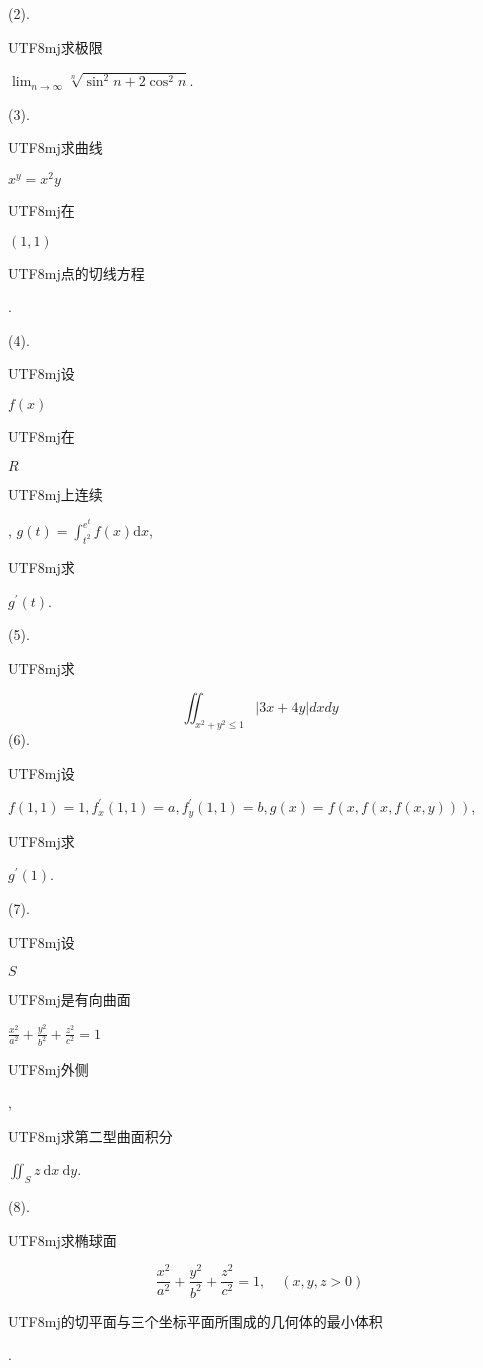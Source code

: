 \documentclass[10pt]{article}
\begin{document}
(2). \begin{CJK}{UTF8}{mj}求极限\end{CJK} $\lim _{n \rightarrow \infty} \sqrt[n]{\sin ^{2} n+2 \cos ^{2} n}$.

(3). \begin{CJK}{UTF8}{mj}求曲线\end{CJK} $x^{y}=x^{2} y$ \begin{CJK}{UTF8}{mj}在\end{CJK} $(1,1)$ \begin{CJK}{UTF8}{mj}点的切线方程\end{CJK}.

(4). \begin{CJK}{UTF8}{mj}设\end{CJK} $f(x)$ \begin{CJK}{UTF8}{mj}在\end{CJK} $R$ \begin{CJK}{UTF8}{mj}上连续\end{CJK}, $g(t)=\int_{t^{2}}^{e^{t}} f(x) \mathrm{d} x$, \begin{CJK}{UTF8}{mj}求\end{CJK} $g^{\prime}(t)$.

(5).\begin{CJK}{UTF8}{mj}求\end{CJK}
$$
\iint_{x^{2}+y^{2} \leqslant 1}|3 x+4 y| d x d y
$$
(6). \begin{CJK}{UTF8}{mj}设\end{CJK} $f(1,1)=1, f_{x}^{\prime}(1,1)=a, f_{y}^{\prime}(1,1)=b, g(x)=f(x, f(x, f(x, y)))$, \begin{CJK}{UTF8}{mj}求\end{CJK} $g^{\prime}(1)$.

(7). \begin{CJK}{UTF8}{mj}设\end{CJK} $S$ \begin{CJK}{UTF8}{mj}是有向曲面\end{CJK} $\frac{x^{2}}{a^{2}}+\frac{y^{2}}{b^{2}}+\frac{z^{2}}{c^{2}}=1$ \begin{CJK}{UTF8}{mj}外侧\end{CJK}, \begin{CJK}{UTF8}{mj}求第二型曲面积分\end{CJK} $\iint_{S} z \mathrm{~d} x \mathrm{~d} y$.

(8). \begin{CJK}{UTF8}{mj}求椭球面\end{CJK}
$$
\frac{x^{2}}{a^{2}}+\frac{y^{2}}{b^{2}}+\frac{z^{2}}{c^{2}}=1, \quad(x, y, z>0)
$$
\begin{CJK}{UTF8}{mj}的切平面与三个坐标平面所围成的几何体的最小体积\end{CJK}.
\end{document}
